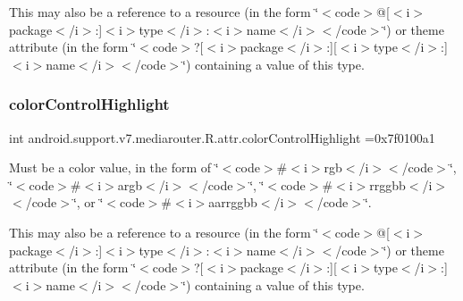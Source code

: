 This may also be a reference to a resource (in the form \char`\"{}$<$code$>$@\mbox{[}$<$i$>$package$<$/i$>$\+:\mbox{]}$<$i$>$type$<$/i$>$\+:$<$i$>$name$<$/i$>$$<$/code$>$\char`\"{}) or theme attribute (in the form \char`\"{}$<$code$>$?\mbox{[}$<$i$>$package$<$/i$>$\+:\mbox{]}\mbox{[}$<$i$>$type$<$/i$>$\+:\mbox{]}$<$i$>$name$<$/i$>$$<$/code$>$\char`\"{}) containing a value of this type. \mbox{\label{classandroid_1_1support_1_1v7_1_1mediarouter_1_1R_1_1attr_abb07fa9a5eea7ae936cbd535a850d6e4}} 
\subsubsection{\texorpdfstring{color\+Control\+Highlight}{colorControlHighlight}}
{\footnotesize\ttfamily int android.\+support.\+v7.\+mediarouter.\+R.\+attr.\+color\+Control\+Highlight =0x7f0100a1\hspace{0.3cm}{\ttfamily [static]}}

Must be a color value, in the form of \char`\"{}$<$code$>$\#$<$i$>$rgb$<$/i$>$$<$/code$>$\char`\"{}, \char`\"{}$<$code$>$\#$<$i$>$argb$<$/i$>$$<$/code$>$\char`\"{}, \char`\"{}$<$code$>$\#$<$i$>$rrggbb$<$/i$>$$<$/code$>$\char`\"{}, or \char`\"{}$<$code$>$\#$<$i$>$aarrggbb$<$/i$>$$<$/code$>$\char`\"{}. 

This may also be a reference to a resource (in the form \char`\"{}$<$code$>$@\mbox{[}$<$i$>$package$<$/i$>$\+:\mbox{]}$<$i$>$type$<$/i$>$\+:$<$i$>$name$<$/i$>$$<$/code$>$\char`\"{}) or theme attribute (in the form \char`\"{}$<$code$>$?\mbox{[}$<$i$>$package$<$/i$>$\+:\mbox{]}\mbox{[}$<$i$>$type$<$/i$>$\+:\mbox{]}$<$i$>$name$<$/i$>$$<$/code$>$\char`\"{}) containing a value of this type. \mbox{\label{classandroid_1_1support_1_1v7_1_1mediarouter_1_1R_1_1attr_a509852bd1ac74db181f64f0400343421}} 
